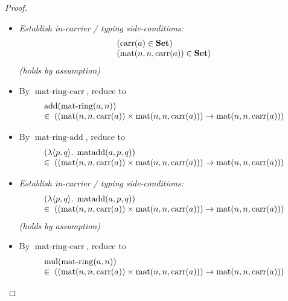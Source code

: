 \documentclass[11pt]{article}
\theoremstyle{plain}
\begin{document}
\begin{proof}
\begin{itemize}[leftmargin=2.8em, itemsep=4pt, parsep=1pt]
  \item[\textbf{22--24}] \emph{Establish in-carrier / typing side-conditions:}
\begin{equation*}
\begin{array}{@{}l@{}}
(\operatorname{carr}(a) \in \mathbf{Set}) \\
(\operatorname{mat}(n, n, \operatorname{carr}(a)) \in \mathbf{Set})
\end{array}
\end{equation*}
  \emph{(holds by assumption)}
  \item[\textbf{25}] By $\operatorname{mat\text{-}ring\text{-}carr}$, reduce to
\begin{equation*}
\begin{array}{@{}l@{}} \operatorname{add}(\operatorname{mat\text{-}ring}(a, n)) \\ \in\; ((\operatorname{mat}(n, n, \operatorname{carr}(a)) \times \operatorname{mat}(n, n, \operatorname{carr}(a))) \to \operatorname{mat}(n, n, \operatorname{carr}(a))) \end{array}
\end{equation*}

  \item[\textbf{26}] By $\operatorname{mat\text{-}ring\text{-}add}$, reduce to
\begin{equation*}
\begin{array}{@{}l@{}} (\lambda \langle p, q \rangle.\; \operatorname{matadd}(a, p, q)) \\ \in\; ((\operatorname{mat}(n, n, \operatorname{carr}(a)) \times \operatorname{mat}(n, n, \operatorname{carr}(a))) \to \operatorname{mat}(n, n, \operatorname{carr}(a))) \end{array}
\end{equation*}

  \item[\textbf{27--28}] \emph{Establish in-carrier / typing side-conditions:}
\begin{equation*}
\begin{array}{@{}l@{}}
\begin{array}{@{}l@{}} (\lambda \langle p, q \rangle.\; \operatorname{matadd}(a, p, q)) \\ \in\; ((\operatorname{mat}(n, n, \operatorname{carr}(a)) \times \operatorname{mat}(n, n, \operatorname{carr}(a))) \to \operatorname{mat}(n, n, \operatorname{carr}(a))) \end{array}
\end{array}
\end{equation*}
  \emph{(holds by assumption)}
  \item[\textbf{29}] By $\operatorname{mat\text{-}ring\text{-}carr}$, reduce to
\begin{equation*}
\begin{array}{@{}l@{}} \operatorname{mul}(\operatorname{mat\text{-}ring}(a, n)) \\ \in\; ((\operatorname{mat}(n, n, \operatorname{carr}(a)) \times \operatorname{mat}(n, n, \operatorname{carr}(a))) \to \operatorname{mat}(n, n, \operatorname{carr}(a))) \end{array}
\end{equation*}


\end{itemize}
\end{proof}
\end{document}
